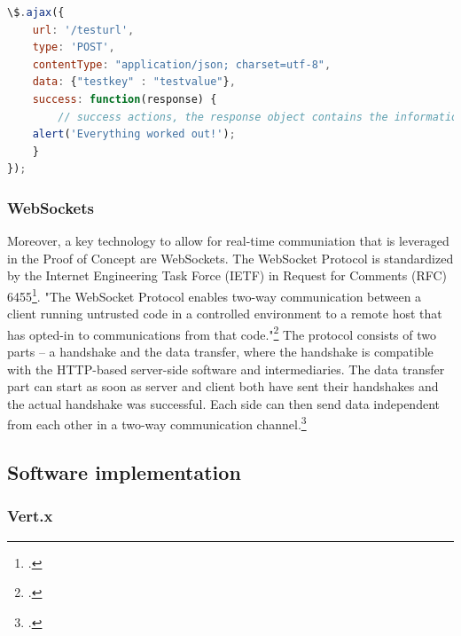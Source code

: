 \begin{lstlisting}[language=javascript,caption={Exemplary jQuery AJAX call},label={lst:jqueryajaxcall}]
\$.ajax({
    url: '/testurl',
    type: 'POST',
    contentType: "application/json; charset=utf-8",
    data: {"testkey" : "testvalue"},
    success: function(response) {
        // success actions, the response object contains the information sent from the server
	alert('Everything worked out!');
    }
});
\end{lstlisting}

\subsubsection{WebSockets}
Moreover, a key technology to allow for real-time communiation that is leveraged
in the Proof of Concept are WebSockets. The WebSocket Protocol is standardized by the Internet Engineering Task Force (IETF) in Request for Comments (RFC) 6455\footcite[Cf.][]{rfc6455}. "The WebSocket Protocol enables two-way communication between a client running untrusted code in a controlled environment to a remote host that has opted-in to communications from that code."\footcite[.][]{rfc6455} The protocol consists of two parts – a handshake and the data transfer, where the handshake is compatible with the HTTP-based server-side software and intermediaries. The data transfer part can start as soon as server and client both have sent their handshakes and the actual handshake was successful. Each side can then send data independent from each other in a two-way communication channel.\footcite[Cf.][]{rfc6455}



\FloatBarrier
\subsection{Software implementation}
\label{software_implementation}

\subsubsection{Vert.x}
\label{implementation_vertx}

